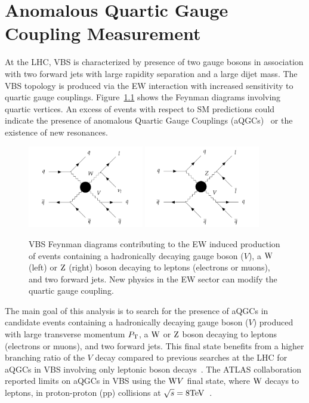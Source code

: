\chapter{Anomalous Quartic Gauge Coupling Measurement} %
\label{cha:anomalous_quartic_gauge_coupling_measurement}
At the LHC, VBS is characterized by presence of two gauge bosons in association with two forward jets with large rapidity separation and a large dijet mass. The VBS topology is produced via the EW interaction with increased sensitivity to quartic gauge couplings. Figure~\ref{fig:feynman} shows the Feynman diagrams involving quartic vertices. An excess of events with respect to SM predictions could indicate the presence of anomalous Quartic Gauge Couplings (aQGCs)~\cite{aqgc_operators} or the existence of new resonances. 

\begin{figure}[!htbp]
\centering
\includegraphics[width=0.45\textwidth]{Pictures/FeynmanDiagram_WV.pdf}
\includegraphics[width=0.45\textwidth]{Pictures/FeynmanDiagram_ZV.pdf}
\caption{VBS Feynman diagrams contributing to the EW induced production of events containing a hadronically decaying gauge boson ($V$), a $\mathrm{W}$ (left) or $\mathrm{Z}$ (right) boson decaying to leptons (electrons or muons), and two forward jets. New physics in the EW sector can modify the quartic gauge coupling.}
\label{fig:feynman}
\end{figure}

The main goal of this analysis is to search for the presence of aQGCs in candidate events containing a hadronically decaying gauge boson ($V$) produced with large transverse momentum $P_\mathrm{T}$, a $\mathrm{W}$ or $\mathrm{Z}$ boson decaying to leptons (electrons or muons), and two forward jets. This final state benefits from a higher branching ratio of the $V$ decay compared to previous searches at the LHC for aQGCs in VBS involving only leptonic boson decays~\cite{Sirunyan:2017ret, ATLAS_ssWW, CMS_ssWW, Aaboud:2016ffv,Aad:2016ett, Sirunyan:2017fvv, Khachatryan:2016mud, Khachatryan:2017jub, Khachatryan:2016vif,Aaboud:2017pds}. The ATLAS collaboration reported limits on aQGCs in VBS using the $\mathrm{W} V$ final state, where $\mathrm{W}$ decays to leptons, in proton-proton (pp) collisions at $\sqrt{s}=8\mathrm{TeV}$~\cite{Aaboud2017}. 

